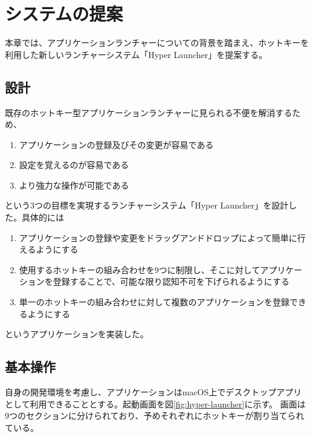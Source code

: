 \chapter{システムの提案}
\label{chap:system}
本章では、アプリケーションランチャーについての背景を踏まえ、ホットキーを利用した新しいランチャーシステム「Hyper Launcher」を提案する。

\newpage

\section{設計}
既存のホットキー型アプリケーションランチャーに見られる不便を解消するため、

\begin{enumerate}
	\item アプリケーションの登録及びその変更が容易である
	\item 設定を覚えるのが容易である
	\item より強力な操作が可能である
\end{enumerate}

という3つの目標を実現するランチャーシステム「Hyper Launcher」を設計した。具体的には

\begin{enumerate}
	\item アプリケーションの登録や変更をドラッグアンドドロップによって簡単に行えるようにする
	\item 使用するホットキーの組み合わせを9つに制限し、そこに対してアプリケーションを登録することで、可能な限り認知不可を下げられるようにする
	\item 単一のホットキーの組み合わせに対して複数のアプリケーションを登録できるようにする
\end{enumerate}

というアプリケーションを実装した。

\section{基本操作}
自身の開発環境を考慮し、アプリケーションはmacOS上でデスクトップアプリとして利用できることとする。起動画面を図\ref{fig:hyper-launcher}に示す。
画面は9つのセクションに分けられており、予めそれぞれにホットキーが割り当てられている。

